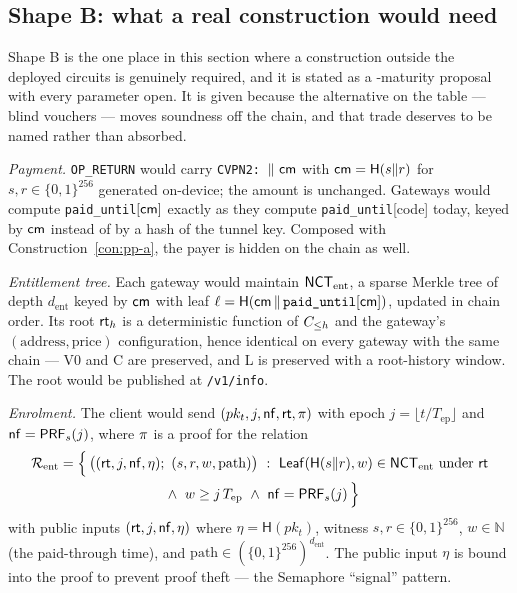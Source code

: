 \subsection{Shape B: what a real construction would need}
\label{sec:pp-constb}

Shape B is the one place in this section where a construction outside the deployed circuits is
genuinely required, and it is stated as a \vision-maturity proposal with every parameter open. It is
given because the alternative on the table --- blind vouchers --- moves soundness off the chain, and
that trade deserves to be named rather than absorbed.

\begin{construction}
\label{con:pp-b}
\emph{Payment.} \texttt{OP\_RETURN} would carry \texttt{CVPN2:}~$\|~\mathsf{cm}$ with
$\mathsf{cm} = \mathsf{H}(s \| r)$ for $s, r \in \{0,1\}^{256}$ generated on-device; the amount is unchanged.
Gateways would compute \texttt{paid\_until}$[\mathsf{cm}]$ exactly as they compute \texttt{paid\_until}[code]
today, keyed by $\mathsf{cm}$ instead of by a hash of the tunnel key. Composed with
Construction~\ref{con:pp-a}, the payer is hidden on the chain as well.

\emph{Entitlement tree.} Each gateway would maintain $\mathsf{NCT}_{\mathrm{ent}}$, a sparse Merkle tree of
depth $d_{\mathrm{ent}}$ keyed by $\mathsf{cm}$ with leaf
$\ell = \mathsf{H}(\mathsf{cm} \,\|\, \texttt{paid\_until}[\mathsf{cm}])$, updated in chain order. Its root
$\mathsf{rt}_{h}$ is a deterministic function of $C_{\le h}$ and the gateway's
$(\text{address},\text{price})$ configuration, hence identical on every gateway with the same chain
--- V0 and C are preserved, and L is preserved with a root-history window. The root would be published
at \texttt{/v1/info}.

\emph{Enrolment.} The client would send $(pk_t, j, \mathsf{nf}, \mathsf{rt}, \pi)$ with epoch
$j = \lfloor t / T_{\mathrm{ep}} \rfloor$ and $\mathsf{nf} = \mathsf{PRF}_s(j)$, where $\pi$ is a proof
for the relation
\begin{multline*}
  \mathcal{R}_{\mathrm{ent}} = \Big\{\,
    \big((\mathsf{rt}, j, \nf, \eta);\ (s, r, w, \mathrm{path})\big) \ :\
    \mathsf{Leaf}(\mathsf{H}(s\|r), w) \in \tree_{\mathrm{ent}} \text{ under } \mathsf{rt} \\
    {}\ \wedge\ w \ge j\,T_{\mathrm{ep}}
    \ \wedge\ \nf = \mathsf{PRF}_s(j)
  \,\Big\}
\end{multline*}
with public inputs $(\mathsf{rt}, j, \mathsf{nf}, \eta)$ where $\eta = \mathsf{H}(pk_t)$, witness
$s, r \in \{0,1\}^{256}$, $w \in \mathbb{N}$ (the paid-through time), and
$\mathrm{path} \in (\{0,1\}^{256})^{d_{\mathrm{ent}}}$. The public input $\eta$ is bound into the
proof to prevent proof theft --- the Semaphore ``signal'' pattern.


\end{construction}
